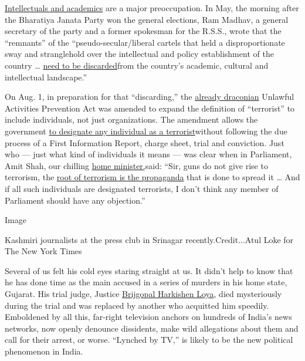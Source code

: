 \href{https://www.nytimes.com/2019/03/14/magazine/gauri-lankesh-murder-journalist.html}{Intellectuals
and academics} are a major preoccupation. In May, the morning after the
Bharatiya Janata Party won the general elections, Ram Madhav, a general
secretary of the party and a former spokesman for the R.S.S., wrote that
the ``remnants'' of the ``pseudo-secular/liberal cartels that held a
disproportionate sway and stranglehold over the intellectual and policy
establishment of the country \ldots{}
\href{https://indianexpress.com/article/opinion/columns/lok-sabha-elections-result-narendra-modi-bjp-government-congress-5745313/}{need
to be discarded}from the country's academic, cultural and intellectual
landscape.''

On Aug. 1, in preparation for that ``discarding,'' the
\href{https://www.hrw.org/report/2010/07/27/back-future/indias-2008-counterterrorism-laws}{already
draconian} Unlawful Activities Prevention Act was amended to expand the
definition of ``terrorist'' to include individuals, not just
organizations. The amendment allows the government
\href{https://www.thehindubusinessline.com/news/uapa-amendment-bill-gets-rajya-sabha-approval/article28796520.ece}{to
designate any individual as a terrorist}without following the due
process of a First Information Report, charge sheet, trial and
conviction. Just who --- just what kind of individuals it means --- was
clear when in Parliament, Amit Shah, our chilling
\href{https://www.youtube.com/watch?v=fnd_ELCFhCM}{home minister,}said:
``Sir, guns do not give rise to terrorism, the
\href{https://thewire.in/rights/uapa-bjp-terrorist-amit-shah-nia}{root
of terrorism is the propaganda} that is done to spread it \ldots{} And
if all such individuals are designated terrorists, I don't think any
member of Parliament should have any objection.''

Image

Kashmiri journalists at the press club in Srinagar
recently.Credit...Atul Loke for The New York Times

Several of us felt his cold eyes staring straight at us. It didn't help
to know that he has done time as the main accused in a series of murders
in his home state, Gujarat. His trial judge, Justice
\href{https://caravanmagazine.in/tag/loya}{Brijgopal Harkishen Loya},
died mysteriously during the trial and was replaced by another who
acquitted him speedily. Emboldened by all this, far-right television
anchors on hundreds of India's news networks, now openly denounce
dissidents, make wild allegations about them and call for their arrest,
or worse. ``Lynched by TV,'' is likely to be the new political
phenomenon in India.

